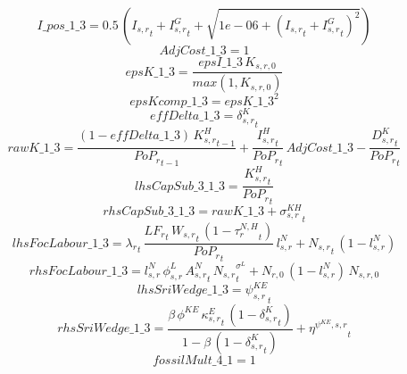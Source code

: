 \begin{dmath*}
I\_pos\_1\_3 = 0.5\, \left({{I_{s,r}}}_{t}+{{I^G_{s,r}}}_{t}+\sqrt{1e-06+\left({{I_{s,r}}}_{t}+{{I^G_{s,r}}}_{t}\right)^{2}}\right)
\end{dmath*}
\begin{dmath*}
AdjCost\_1\_3 = 1
\end{dmath*}
\begin{dmath*}
epsK\_1\_3 = \frac{{epsI\_1\_3}\, {{K_{s,r,0}}}}{max(1,{{K_{s,r,0}}})}
\end{dmath*}
\begin{dmath*}
epsKcomp\_1\_3 = {epsK\_1\_3}^{2}
\end{dmath*}
\begin{dmath*}
effDelta\_1\_3 = {{\delta^{K}_{s,r}}}_{t}
\end{dmath*}
\begin{dmath*}
rawK\_1\_3 = \frac{\left(1-{effDelta\_1\_3}\right)\, {{K^H_{s,r}}}_{t-1}}{{{PoP_r}}_{t-1}}+\frac{{{I^H_{s,r}}}_{t}}{{{PoP_r}}_{t}}\, {AdjCost\_1\_3}-\frac{{{D^K_{s,r}}}_{t}}{{{PoP_r}}_{t}}
\end{dmath*}
\begin{dmath*}
lhsCapSub\_3\_1\_3 = \frac{{{K^H_{s,r}}}_{t}}{{{PoP_r}}_{t}}
\end{dmath*}
\begin{dmath*}
rhsCapSub\_3\_1\_3 = {rawK\_1\_3}+{{\sigma^{KH}_{s,r}}}_{t}
\end{dmath*}
\begin{dmath*}
lhsFocLabour\_1\_3 = {\lambda_r}_{t}\, \frac{{{LF_r}}_{t}\, {{W_{s,r}}}_{t}\, \left(1-{{\tau^{N,H}_{r}}}_{t}\right)}{{{PoP_r}}_{t}}\, {{l^{N}_{s,r}}}+{{N_{s,r}}}_{t}\, \left(1-{{l^{N}_{s,r}}}\right)
\end{dmath*}
\begin{dmath*}
rhsFocLabour\_1\_3 = {{l^{N}_{s,r}}}\, {{\phi^{L}_{s,r}}}\, {{A^{N}_{s,r}}}_{t}\, {{N_{s,r}}}_{t}^{{{\sigma^{L}}}}+{{N_{r,0}}}\, \left(1-{{l^{N}_{s,r}}}\right)\, {{N_{s,r,0}}}
\end{dmath*}
\begin{dmath*}
lhsSriWedge\_1\_3 = {{\psi^{KE}_{s,r}}}_{t}
\end{dmath*}
\begin{dmath*}
rhsSriWedge\_1\_3 = \frac{{{\beta}}\, {{\phi^{KE}}}\, {{\kappa^{E}_{s,r}}}_{t}\, \left(1-{{\delta^{K}_{s,r}}}_{t}\right)}{1-{{\beta}}\, \left(1-{{\delta^{K}_{s,r}}}_{t}\right)}+{{\eta^{\psi^{KE},s,r}}}_{t}
\end{dmath*}
\begin{dmath*}
fossilMult\_4\_1 = 1
\end{dmath*}
